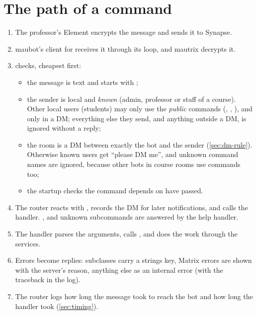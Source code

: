 \section{The path of a command}
\label{sec:command-path}

\begin{enumerate}
  \item The professor's Element encrypts the message and sends it to Synapse.
  \item maubot's client for  receives it through its  loop, and
        mautrix decrypts it.
  \item {} checks, cheapest first:
        \begin{itemize}
          \item the message is text and starts with ;
          \item the sender is local and \emph{known} (admin, professor or staff of a course).
                Other local users (students) may only use the \emph{public} commands
                (, , ), and only in a DM;
                everything else they send, and anything outside a DM, is ignored without
                a reply;
          \item the room is a DM between exactly the bot and the sender
                (\autoref{sec:dm-rule}). Otherwise known users get \enquote{please DM me},
                and unknown command names are ignored, because other bots in course rooms
                use \cmd{!} commands too;
          \item the startup checks the command depends on have passed.
        \end{itemize}
  \item The router reacts with \robot, records the DM for later notifications, and calls the
        handler. ,  and unknown subcommands are answered by the
        help handler.
  \item The handler parses the arguments, calls , and does
        the work through the services.
  \item Errors become replies:  subclasses carry a strings key, Matrix
        errors are shown with the server's reason, anything else as an internal error
        (with the traceback in the log).
  \item The router logs how long the message took to reach the bot and how long the handler
        took (\autoref{sec:timing}).
\end{enumerate}


